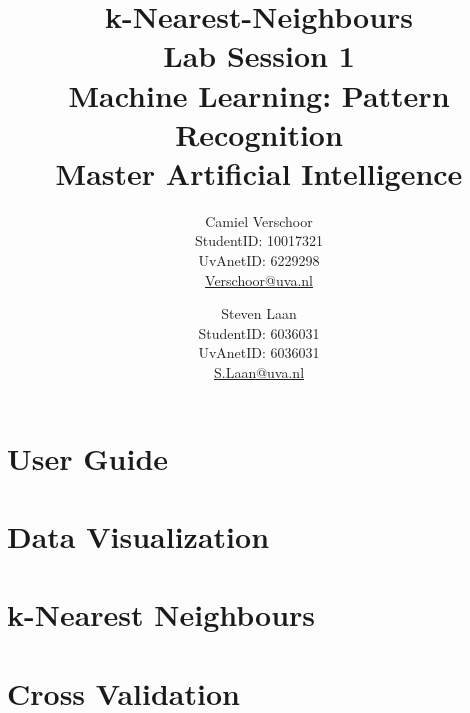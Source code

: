 \documentclass[a4paper]{article}
\title{k-Nearest-Neighbours\\\large Lab Session 1\\Machine Learning: Pattern Recognition\\Master Artificial Intelligence}
\author{Camiel Verschoor \\StudentID: 10017321\\UvAnetID: 6229298\\ \url{Verschoor@uva.nl} \and Steven Laan\\StudentID: 6036031\\UvAnetID: 6036031\\\url{S.Laan@uva.nl}}
\begin{document}
\maketitle

\section{User Guide}
\section{Data Visualization}

\section{k-Nearest Neighbours}

\section{Cross Validation}
\end{document}
